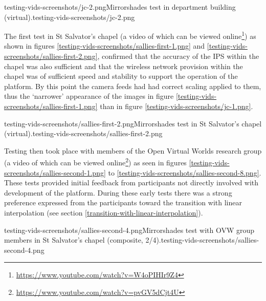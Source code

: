        {testing-vids-screenshots/jc-2.png}{Mirrorshades test in department building (virtual).}{testing-vids-screenshots/jc-2.png}


The first test in St Salvator's chapel (a video of which can be viewed online\footnote{\url{https://www.youtube.com/watch?v=W4oPIHIr9Z4}}) as shown in figures \ref{testing-vids-screenshots/sallies-first-1.png} and \ref{testing-vids-screenshots/sallies-first-2.png}, confirmed that the accuracy of the IPS within the chapel was also sufficient and that the wireless network provision within the chapel was of sufficient speed and stability to support the operation of the platform. By this point the camera feeds had had correct scaling applied to them, thus the `narrower' appearance of the images in figure \ref{testing-vids-screenshots/sallies-first-1.png} than in figure \ref{testing-vids-screenshots/jc-1.png}.

       {testing-vids-screenshots/sallies-first-2.png}{Mirrorshades test in St Salvator's chapel (virtual).}{testing-vids-screenshots/sallies-first-2.png}

Testing then took place with members of the Open Virtual Worlds research group (a video of which can be viewed online\footnote{\url{https://www.youtube.com/watch?v=pvGV5dCjt4U}}) as seen in figures \ref{testing-vids-screenshots/sallies-second-1.png} to \ref{testing-vids-screenshots/sallies-second-8.png}. These tests provided initial feedback from participants not directly involved with development of the platform. During these early tests there was a strong preference expressed from the participants toward the transition with linear interpolation (see section \ref{transition-with-linear-interpolation}).

       {testing-vids-screenshots/sallies-second-4.png}{Mirrorshades test with OVW group members in St Salvator's chapel (composite, 2/4).}{testing-vids-screenshots/sallies-second-4.png}

